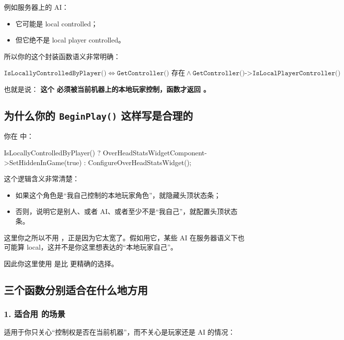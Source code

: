 例如服务器上的 AI：

\begin{itemize}
	\item 它可能是 local controlled；
	\item 但它绝不是 local player controlled。
\end{itemize}

所以你的这个封装函数语义非常明确：

$
\texttt{IsLocallyControlledByPlayer()}
\iff
\texttt{GetController() 存在}
\land
\texttt{GetController()->IsLocalPlayerController()}
$

也就是说：	\textbf{这个  必须被当前机器上的本地玩家控制，函数才返回 。}

\subsection{为什么你的 \texttt{BeginPlay()} 这样写是合理的}

你在  中：
\begin{code}
	IsLocallyControlledByPlayer()
	? OverHeadStatsWidgetComponent->SetHiddenInGame(true)
	: ConfigureOverHeadStatsWidget();
\end{code}

这个逻辑含义非常清楚：

\begin{itemize}
	\item 如果这个角色是“我自己控制的本地玩家角色”，就隐藏头顶状态条；
	\item 否则，说明它是别人、或者 AI、或者至少不是“我自己”，就配置头顶状态条。
\end{itemize}

这里你之所以不用 ，正是因为它太宽了。假如用它，某些 AI 在服务器语义下也可能算 local，这并不是你这里想表达的“本地玩家自己”。

因此你这里使用  是比  更精确的选择。

\subsection{三个函数分别适合在什么地方用}

\subsubsection*{1. 适合用  的场景}

适用于你只关心“控制权是否在当前机器”，而不关心是玩家还是 AI 的情况：

